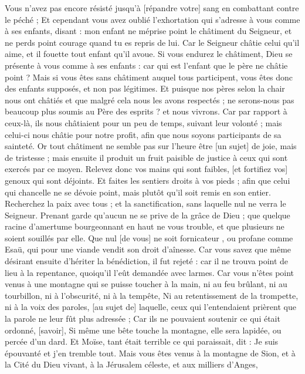 \begin{multicols}{2}
Vous n'avez pas encore résisté jusqu'à [répandre votre] sang en combattant contre le péché ;
Et cependant vous avez oublié l'exhortation qui s'adresse à vous comme à ses enfants, disant : mon enfant ne méprise point le châtiment du Seigneur, et ne perds point courage quand tu es repris de lui.
Car le Seigneur châtie celui qu'il aime, et il fouette tout enfant qu'il avoue.
Si vous endurez le châtiment, Dieu se présente à vous comme à ses enfants : car qui est l'enfant que le père ne châtie point ?
Mais si vous êtes sans châtiment auquel tous participent, vous êtes donc des enfants supposés, et non pas légitimes.
Et puisque nos pères selon la chair nous ont châtiés et que malgré cela nous les avons respectés ; ne serons-nous pas beaucoup plus soumis au Père des esprits ? et nous vivrons.
Car par rapport à ceux-là, ils nous châtiaient pour un peu de temps, suivant leur volonté ; mais celui-ci nous châtie pour notre profit, afin que nous soyons participants de sa sainteté.
Or tout châtiment ne semble pas sur l'heure être [un sujet] de joie, mais de tristesse ; mais ensuite il produit un fruit paisible de justice à ceux qui sont exercés par ce moyen.
Relevez donc vos mains qui sont faibles, [et fortifiez vos] genoux qui sont déjoints.
Et faites les sentiers droits à vos pieds ; afin que celui qui chancelle ne se dévoie point, mais plutôt qu'il soit remis en son entier.
Recherchez la paix avec tous ; et la sanctification, sans laquelle nul ne verra le Seigneur.
Prenant garde qu'aucun ne se prive de la grâce de Dieu ; que quelque racine d'amertume bourgeonnant en haut ne vous trouble, et que plusieurs ne soient souillés par elle.
Que nul [de vous] ne soit fornicateur , ou profane comme Esaü, qui pour une viande vendit son droit d'aînesse.
Car vous savez que même désirant ensuite d'hériter la bénédiction, il fut rejeté : car il ne trouva point de lieu à la repentance, quoiqu'il l'eût demandée avec larmes.
Car vous n'êtes point venus à une montagne qui se puisse toucher à la main, ni au feu brûlant, ni au tourbillon, ni à l'obscurité, ni à la tempête,
Ni au retentissement de la trompette, ni à la voix des paroles, [au sujet de] laquelle, ceux qui l'entendaient prièrent que la parole ne leur fût plus adressée ;
Car ils ne pouvaient soutenir ce qui était ordonné, [savoir], Si même une bête touche la montagne, elle sera lapidée, ou percée d'un dard.
Et Moïse, tant était terrible ce qui paraissait, dit : Je suis épouvanté et j'en tremble tout.
Mais vous êtes venus à la montagne de Sion, et à la Cité du Dieu vivant, à la Jérusalem céleste, et aux milliers d'Anges,

\end{multicols}
